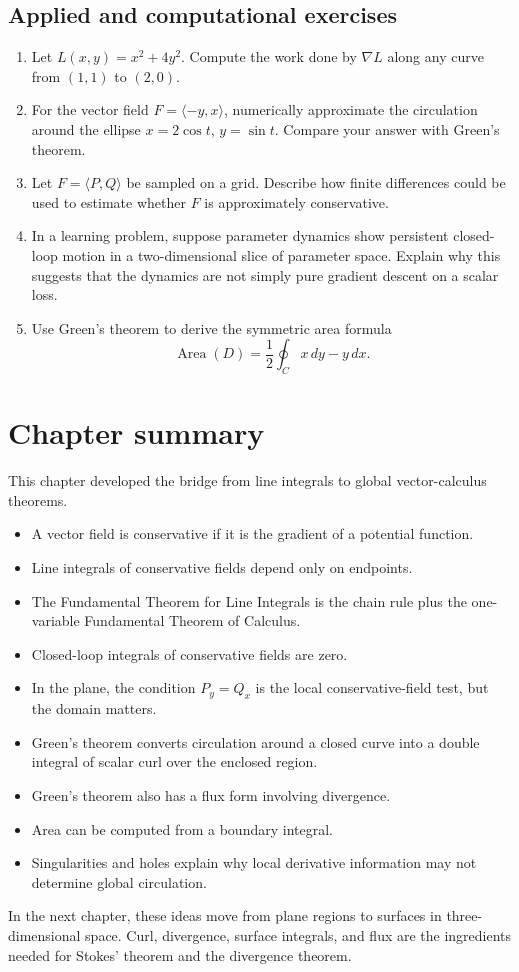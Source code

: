 \documentclass[11pt,oneside]{book}
\newcommand{\grad}{\nabla}
\begin{document}
\subsection*{Applied and computational exercises}
\begin{enumerate}[start=14]
  \item Let $L(x,y)=x^2+4y^2$. Compute the work done by $\grad L$ along any curve from $(1,1)$ to $(2,0)$.
  \item For the vector field $F=\langle -y,x\rangle$, numerically approximate the circulation around the ellipse $x=2\cos t$, $y=\sin t$. Compare your answer with Green's theorem.
  \item Let $F=\langle P,Q\rangle$ be sampled on a grid. Describe how finite differences could be used to estimate whether $F$ is approximately conservative.
  \item In a learning problem, suppose parameter dynamics show persistent closed-loop motion in a two-dimensional slice of parameter space. Explain why this suggests that the dynamics are not simply pure gradient descent on a scalar loss.
  \item Use Green's theorem to derive the symmetric area formula
  \[
  \operatorname{Area}(D)=\frac12\oint_C x\,dy-y\,dx.
  \]
\end{enumerate}

\section{Chapter summary}

This chapter developed the bridge from line integrals to global vector-calculus theorems.
\begin{itemize}
  \item A vector field is conservative if it is the gradient of a potential function.
  \item Line integrals of conservative fields depend only on endpoints.
  \item The Fundamental Theorem for Line Integrals is the chain rule plus the one-variable Fundamental Theorem of Calculus.
  \item Closed-loop integrals of conservative fields are zero.
  \item In the plane, the condition $P_y=Q_x$ is the local conservative-field test, but the domain matters.
  \item Green's theorem converts circulation around a closed curve into a double integral of scalar curl over the enclosed region.
  \item Green's theorem also has a flux form involving divergence.
  \item Area can be computed from a boundary integral.
  \item Singularities and holes explain why local derivative information may not determine global circulation.
\end{itemize}

In the next chapter, these ideas move from plane regions to surfaces in three-dimensional space. Curl, divergence, surface integrals, and flux are the ingredients needed for Stokes' theorem and the divergence theorem.
\end{document}
